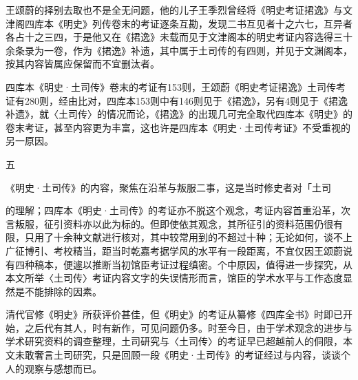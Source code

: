 王颂蔚的择别去取也不是全无问题，他的儿子王季烈曾经将《明史考证捃逸》与文津阁四库本《明史》列传卷末的考证逐条互勘，发现二书互见者十之六七，互异者各占十之三四，于是他又在《捃逸》未载而见于文津阁本的明史考证内容选得三十余条录为一卷，作为《捃逸》补遗，其中属于土司传的有四则，并见于文渊阁本，按其内容皆属应保留而不宜删汰者。

四库本《明史·土司传》卷末的考证有153则，王颂蔚《明史考证捃逸》土司传考证有280则，经由比对，四库本153则中有146则见于《捃逸》，另有4则见于《捃逸补遗》，就〈土司传〉的情况而论，《捃逸》的出现几可完全取代四库本《明史》的卷末考证，甚至内容更为丰富，这也许是四库本《明史·土司传考证》不受重视的另一原因。

五

\begin{BookQuote}
《明史·土司传》的内容，聚焦在沿革与叛服二事，这是当时修史者对「土司
\end{BookQuote}

的理解；四库本《明史·土司传》的考证亦不脱这个观念，考证内容首重沿革，次言叛服，征引资料亦以此为标的。但即使依其观念，其所征引的资料范围仍很有限，只用了十余种文献进行核对，其中较常用到的不超过十种；无论如何，谈不上广征博引、考校精当，距当时乾嘉考据学风的水平有一段距离，不宜仅因王颂蔚说有四种稿本，便遽以推断当初馆臣考证过程缜密。个中原因，值得进一步探究，从本文所举〈土司传〉考证内容文字的失误情形而言，馆臣的学术水平与工作态度显然是不能排除的因素。

清代官修《明史》所获评价甚佳，但《明史》的考证从纂修《四库全书》时即已开始，之后代有其人，时有新作，可见问题仍多。时至今日，由于学术观念的进步与学术研究资料的调查整理，土司研究与〈土司传〉的考证早已超越前人的侗限，本文未敢奢言土司研究，只是回顾一段《明史·土司传》的考证经过与内容，谈谈个人的观察与感想而已。
